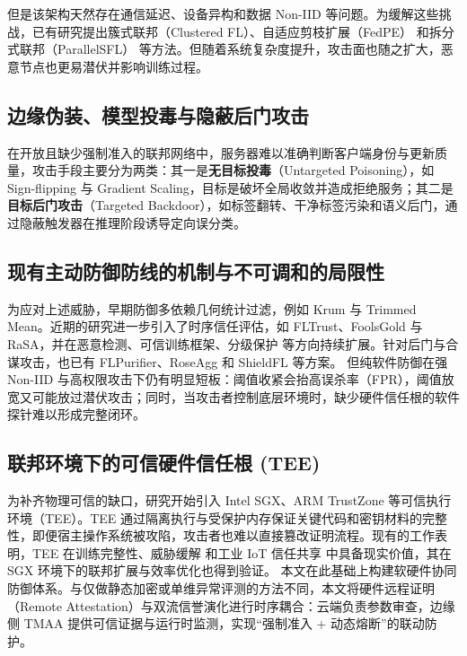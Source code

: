 \documentclass[11pt, a4paper, UTF8, fontset=fandol]{ctexart}
\begin{document}
但是该架构天然存在通信延迟、设备异构和数据 Non-IID 等问题。为缓解这些挑战，已有研究提出簇式联邦（Clustered FL）\cite{r9_clustered}、自适应剪枝扩展（FedPE）\cite{fedpe} 和拆分式联邦（ParallelSFL）\cite{parallelsfl} 等方法。但随着系统复杂度提升，攻击面也随之扩大，恶意节点也更易潜伏并影响训练过程。

\subsection{边缘伪装、模型投毒与隐蔽后门攻击}
在开放且缺少强制准入的联邦网络中，服务器难以准确判断客户端身份与更新质量，攻击手段主要分为两类：其一是\textbf{无目标投毒}（Untargeted Poisoning），如 Sign-flipping 与 Gradient Scaling，目标是破坏全局收敛并造成拒绝服务；其二是\textbf{目标后门攻击}（Targeted Backdoor），如标签翻转、干净标签污染和语义后门，通过隐蔽触发器在推理阶段诱导定向误分类。

\subsection{现有主动防御防线的机制与不可调和的局限性}
为应对上述威胁，早期防御多依赖几何统计过滤，例如 Krum\cite{blanchard2017krum} 与 Trimmed Mean\cite{yin2018byzantine}。近期的研究进一步引入了时序信任评估，如 FLTrust\cite{cao2021fltrust}、FoolsGold\cite{fung2020foolsgold} 与 RaSA\cite{wang2025rasa}，并在恶意检测\cite{dou2025toward}、可信训练框架\cite{lu2025tmt}、分级保护\cite{wang2024federated} 等方向持续扩展。针对后门与合谋攻击，也已有 FLPurifier\cite{flpurifier}、RoseAgg\cite{roseagg} 和 ShieldFL\cite{shieldfl} 等方案。
但纯软件防御在强 Non-IID 与高权限攻击下仍有明显短板：阈值收紧会抬高误杀率（FPR），阈值放宽又可能放过潜伏攻击；同时，当攻击者控制底层环境时，缺少硬件信任根的软件探针难以形成完整闭环。

\subsection{联邦环境下的可信硬件信任根 (TEE)}
为补齐物理可信的缺口，研究开始引入 Intel SGX、ARM TrustZone 等可信执行环境（TEE）。TEE 通过隔离执行与受保护内存保证关键代码和密钥材料的完整性，即便宿主操作系统被攻陷，攻击者也难以直接篡改证明流程\cite{liao2024verifiable,zhang2025rppfl}。现有的工作表明，TEE 在训练完整性\cite{r1_tee_integrity}、威胁缓解\cite{r5_tee_mitigating} 和工业 IoT 信任共享\cite{r12_iot_tee} 中具备现实价值，其在 SGX 环境下的联邦扩展与效率优化也得到验证\cite{xu2021distributed,yan2024efficient}。
本文在此基础上构建软硬件协同防御体系。与仅做静态加密或单维异常评测的方法不同，本文将硬件远程证明（Remote Attestation）与双流信誉演化进行时序耦合：云端负责参数审查，边缘侧 TMAA 提供可信证据与运行时监测，实现“强制准入 + 动态熔断”的联动防护。
\end{document}
